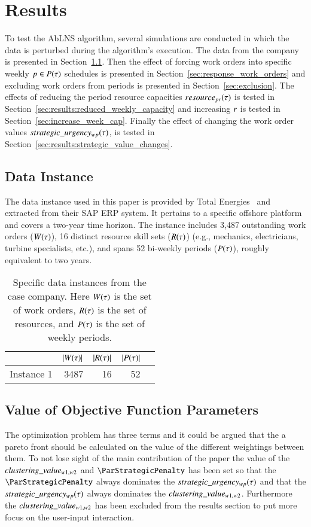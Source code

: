 \section{Results}\label{sec:3-results}
To test the AbLNS algorithm, several simulations are conducted in which the data
is perturbed during the algorithm’s execution. The data from the
company is presented in Section~\ref{sec:data_instance}. Then the effect of
forcing work orders into specific weekly $p \in P(\tau)$
schedules is presented in Section~\ref{sec:response_work_orders} and excluding
work orders from periods is presented in Section~\ref{sec:exclusion}. The
effects of reducing the period resource capacities $\ParStrategicResource$ is
tested in Section~\ref{sec:results:reduced_weekly_capacity} and increasing
$r$ is tested in  Section~\ref{sec:increase_week_cap}. Finally
the effect of changing the work order values $strategic\_urgency_{w p}(\tau)$, is tested
in Section~\ref{sec:results:strategic_value_changes}.

\subsection{Data Instance}\label{sec:data_instance}
The data instance used in this paper is provided by Total
Energies~\citep{total-energies} and extracted from their SAP ERP system. It
pertains to a specific offshore platform and covers a two-year time horizon. The
instance includes 3,487 outstanding work orders ($W(\tau)$), 16 distinct
resource skill sets ($R(\tau)$) (e.g., mechanics, electricians, turbine
specialists, etc.), and spans 52 bi-weekly periods ($P(\tau)$), roughly
equivalent to two years.
 
\begin{table}[H]
\centering
\begin{tabular}{lrrrr}
\toprule
           & $|W(\tau)|$ & $|R(\tau)|$ & $|P(\tau)|$ \\ \midrule
Instance 1 & 3487                & 16               & 52             \\ \bottomrule
\end{tabular}

\caption{Specific data instances from the case company. Here $\SetWorkOrder$ is the set of work orders, $R(\tau)$ is the set of resources, and $P(\tau)$ is the set of weekly periods.} %
\end{table}

\subsection{Value of Objective Function Parameters}
The optimization problem has three terms and it could be argued that the
a pareto front should be calculated on the value of the different weightings
between them. To not lose sight of the main contribution of the paper the
value of the $clustering\_value_{w1, w2}$ and $\ParStrategicPenalty$ has been set so
that the $\ParStrategicPenalty$ always dominates the $strategic\_urgency_{w p}(\tau)$ and
that the $strategic\_urgency_{w p}(\tau)$ always dominates the $clustering\_value_{w1, w2}$.
Furthermore the $clustering\_value_{w1, w2}$ has been excluded from the results section
to put more focus on the user-input interaction.

